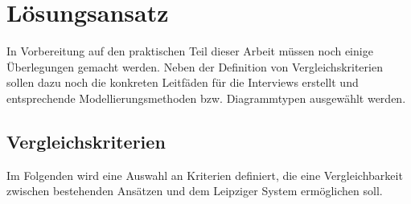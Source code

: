 \chapter{Lösungsansatz}\label{ch:approach}

In Vorbereitung auf den praktischen Teil dieser Arbeit müssen noch einige Überlegungen gemacht werden. Neben der Definition von Vergleichskriterien sollen dazu noch die konkreten Leitfäden für die Interviews erstellt und entsprechende Modellierungsmethoden bzw. Diagrammtypen ausgewählt werden.

\section{Vergleichskriterien}

Im Folgenden wird eine Auswahl an Kriterien definiert, die eine Vergleichbarkeit zwischen bestehenden Ansätzen und dem Leipziger System ermöglichen soll.


